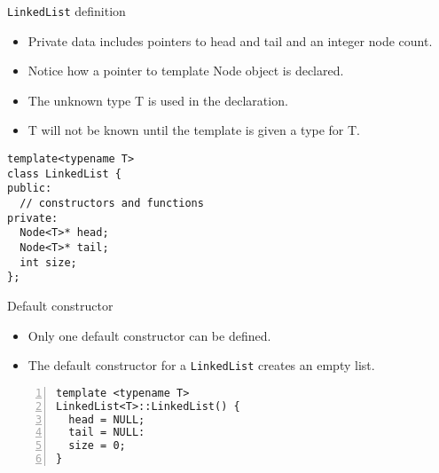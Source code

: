 \documentclass{beamer}
\begin{document}
\begin{frame}[fragile]{\lstinline$LinkedList$ definition}

\begin{itemize}
\item Private data includes pointers to head and tail and an integer
  node count.

\item Notice how a pointer to template Node object is declared.

\item The unknown type T is used in the declaration.

\item T will not be known until the template is given a type for T.

\end{itemize}

\begin{lstlisting}
template<typename T>
class LinkedList {
public:
  // constructors and functions
private:
  Node<T>* head;
  Node<T>* tail;
  int size;
};
\end{lstlisting}

\end{frame}


\begin{frame}[fragile]{Default constructor}

\begin{itemize}
\item Only one default constructor can be defined.

\item The default constructor for a \lstinline$LinkedList$ creates an empty list.
\end{itemize}

\begin{lstlisting}[numbers=left]
template <typename T>
LinkedList<T>::LinkedList() {
  head = NULL;
  tail = NULL:
  size = 0;
}
\end{lstlisting}

\end{frame}

\end{document}
